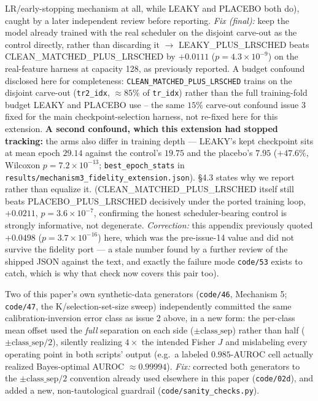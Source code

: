 \documentclass[10pt]{article} %
\begin{document}
\begin{description}
  LR/early-stopping mechanism at all, while LEAKY and PLACEBO both do),
  caught by a later independent review before reporting. \textit{Fix
  (final):} keep the model already trained with the real scheduler on
  the disjoint carve-out as the control directly, rather than discarding
  it $\rightarrow$ LEAKY\_PLUS\_LRSCHED beats
  CLEAN\_MATCHED\_PLUS\_LRSCHED by $+0.0111$ ($p=4.3\times10^{-9}$) on the
  real-feature harness at capacity 128, as previously reported. A budget confound
  disclosed here for completeness: \texttt{CLEAN\_MATCHED\_PLUS\_LRSCHED}
  trains on the disjoint carve-out (\texttt{tr2\_idx}, $\approx85\%$ of
  \texttt{tr\_idx}) rather than the full training-fold budget LEAKY and
  PLACEBO use -- the same $15\%$ carve-out confound issue 3 fixed for the
  main checkpoint-selection harness, not re-fixed here for this
  extension. \textbf{A second confound, which this extension had stopped
  tracking:} the arms also differ in training depth --- LEAKY's kept
  checkpoint sits at mean epoch $29.14$ against the control's $19.75$ and
  the placebo's $7.95$ ($+47.6\%$, Wilcoxon $p=7.2\times10^{-13}$;
  \texttt{best\_epoch\_stats} in
  \texttt{results/mechanism3\_fidelity\_extension.json}). §4.3 states why we
  report rather than equalize it. (CLEAN\_MATCHED\_PLUS\_LRSCHED itself
  still beats PLACEBO\_PLUS\_LRSCHED decisively under the ported training
  loop, $+0.0211$, $p=3.6\times10^{-7}$, confirming the honest
  scheduler-bearing control is strongly informative, not
  degenerate. \emph{Correction:} this appendix previously quoted $+0.0498$
  ($p=3.7\times10^{-16}$) here, which was the pre-issue-14 value and did not
  survive the fidelity port --- a stale number found by a further review of
  the shipped JSON against the text, and exactly the failure mode
  \texttt{code/53} exists to catch, which is why that check now covers this
  pair too).
\item[11.] Two of this paper's own synthetic-data generators
  (\texttt{code/46}, Mechanism 5; \texttt{code/47}, the K/selection-set-size
  sweep) independently committed the same calibration-inversion error class
  as issue 2 above, in a new form: the per-class mean offset used the
  \emph{full} separation on each side ($\pm\text{class\_sep}$) rather than
  half ($\pm\text{class\_sep}/2$), silently realizing $4\times$ the
  intended Fisher $J$ and mislabeling every operating point in both
  scripts' output (e.g.\ a labeled $0.985$-AUROC cell actually realized
  Bayes-optimal AUROC $\approx0.99994$). \textit{Fix:} corrected both
  generators to the $\pm\text{class\_sep}/2$ convention already used
  elsewhere in this paper (\texttt{code/02d}), and added a new,
  non-tautological guardrail (\texttt{code/sanity\_checks.py}).


\end{description}
\end{document}
